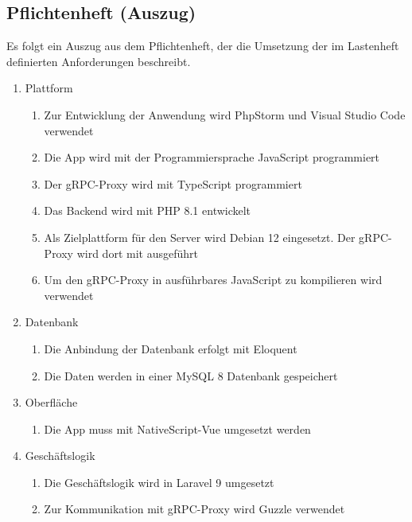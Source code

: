 \subsection{Pflichtenheft (Auszug)}
\label{app:Pflichtenheft}
Es folgt ein Auszug aus dem Pflichtenheft, der die Umsetzung der im Lastenheft definierten Anforderungen beschreibt.

\begin{enumerate}[itemsep=0em,partopsep=0em,parsep=0em,topsep=0em]
\item Plattform
	\begin{enumerate}
		\item Zur Entwicklung der Anwendung wird PhpStorm und Visual Studio Code verwendet
		\item Die App wird mit der Programmiersprache JavaScript programmiert
		\item Der gRPC-Proxy wird mit TypeScript programmiert
		\item Das Backend wird mit PHP 8.1 entwickelt
		\item Als Zielplattform für den Server wird Debian 12 eingesetzt. Der gRPC-Proxy wird dort mit  ausgeführt
		\item Um den gRPC-Proxy in ausführbares JavaScript zu kompilieren wird  verwendet
	\end{enumerate}
\item Datenbank
	\begin{enumerate}
		\item Die Anbindung der Datenbank erfolgt mit Eloquent
		\item Die Daten werden in einer MySQL 8 Datenbank gespeichert
	\end{enumerate}
\item Oberfläche
	\begin{enumerate}
		\item Die App muss mit NativeScript-Vue umgesetzt werden
	\end{enumerate}
\item Geschäftslogik
	\begin{enumerate}
		\item Die Geschäftslogik wird in Laravel 9 umgesetzt
		\item Zur Kommunikation mit gRPC-Proxy wird Guzzle verwendet
	\end{enumerate}
\end{enumerate}
